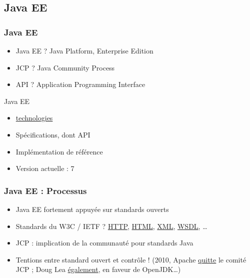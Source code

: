 \documentclass[english, french]{beamer}
\begin{document}
\subsection{Java EE}
\begin{frame}
	\frametitle{Java EE}
	\begin{itemize}
		\item Java EE ? \pause Java Platform, Enterprise Edition \pause
		\item JCP ? \pause Java Community Process \pause
		\item API ? \pause Application Programming Interface \pause
	\end{itemize}
	\begin{block}{Java EE}
		\begin{itemize}
			\item \href{http://www.oracle.com/technetwork/java/javaee/tech/index.html}{technologies}
			\item Spécifications, dont API
			\item Implémentation de référence
			\item Version actuelle : 7
		\end{itemize}
	\end{block}
\end{frame}

\begin{frame}
	\frametitle{Java EE : Processus}
	\begin{itemize}
		\item Java EE fortement appuyée sur standards ouverts
		\item Standards du W3C / IETF ?\pause{} \href{http://www.w3.org/Protocols/}{HTTP}, \href{http://www.w3.org/html/}{HTML}, \href{http://www.w3.org/XML/}{XML}, \href{http://www.w3.org/TR/wsdl}{WSDL}, …\pause
		\item JCP : implication de \og{}la communauté\fg{} pour standards Java
		\item Tentions entre standard ouvert et contrôle ! (2010, Apache \href{https://blogs.apache.org/foundation/entry/the_asf_resigns_from_the}{quitte} le comité JCP ; Doug Lea \href{http://gee.cs.oswego.edu/dl/html/jcp22oct10.html}{également}, en faveur de OpenJDK…)
	\end{itemize}
\end{frame}
\end{document}
